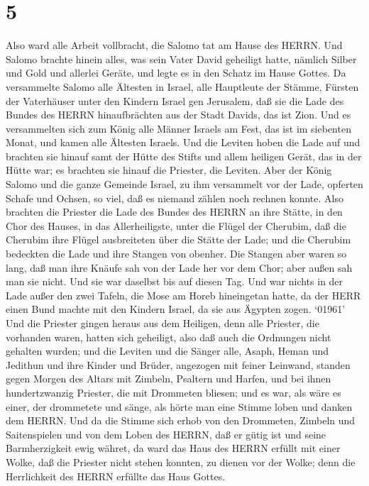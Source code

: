 \hypertarget{section-4}{%
\section{5}\label{section-4}}

 Also ward alle Arbeit vollbracht, die Salomo tat am Hause
des HERRN. Und Salomo brachte hinein alles, was sein Vater David
geheiligt hatte, nämlich Silber und Gold und allerlei Geräte, und legte
es in den Schatz im Hause Gottes.  Da versammelte Salomo
alle Ältesten in Israel, alle Hauptleute der Stämme, Fürsten der
Vaterhäuser unter den Kindern Israel gen Jerusalem, daß sie die Lade des
Bundes des HERRN hinaufbrächten aus der Stadt Davids, das ist Zion.
 Und es versammelten sich zum König alle Männer Israels am
Fest, das ist im siebenten Monat,  und kamen alle Ältesten
Israels. Und die Leviten hoben die Lade auf  und brachten
sie hinauf samt der Hütte des Stifts und allem heiligen Gerät, das in
der Hütte war; es brachten sie hinauf die Priester, die Leviten.
 Aber der König Salomo und die ganze Gemeinde Israel, zu ihm
versammelt vor der Lade, opferten Schafe und Ochsen, so viel, daß es
niemand zählen noch rechnen konnte.  Also brachten die
Priester die Lade des Bundes des HERRN an ihre Stätte, in den Chor des
Hauses, in das Allerheiligste, unter die Flügel der Cherubim,
 daß die Cherubim ihre Flügel ausbreiteten über die Stätte
der Lade; und die Cherubim bedeckten die Lade und ihre Stangen von
obenher.  Die Stangen aber waren so lang, daß man ihre
Knäufe sah von der Lade her vor dem Chor; aber außen sah man sie nicht.
Und sie war daselbst bis auf diesen Tag.  Und war nichts in
der Lade außer den zwei Tafeln, die Mose am Horeb hineingetan hatte, da
der HERR einen Bund machte mit den Kindern Israel, da sie aus Ägypten
zogen.  `01961' Und die Priester gingen heraus aus dem
Heiligen, denn alle Priester, die vorhanden waren, hatten sich
geheiligt, also daß auch die Ordnungen nicht gehalten wurden;
 und die Leviten und die Sänger alle, Asaph, Heman und
Jedithun und ihre Kinder und Brüder, angezogen mit feiner Leinwand,
standen gegen Morgen des Altars mit Zimbeln, Psaltern und Harfen, und
bei ihnen hundertzwanzig Priester, die mit Drommeten bliesen;
 und es war, als wäre es einer, der drommetete und sänge,
als hörte man eine Stimme loben und danken dem HERRN. Und da die Stimme
sich erhob von den Drommeten, Zimbeln und Saitenspielen und von dem
Loben des HERRN, daß er gütig ist und seine Barmherzigkeit ewig währet,
da ward das Haus des HERRN erfüllt mit einer Wolke,  daß
die Priester nicht stehen konnten, zu dienen vor der Wolke; denn die
Herrlichkeit des HERRN erfüllte das Haus Gottes.

